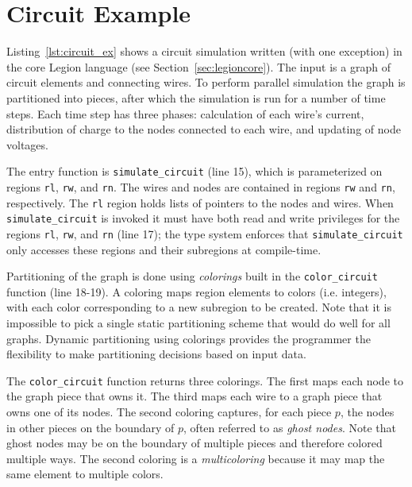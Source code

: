 
\section{Circuit Example}
\label{sec:example}

Listing~\ref{lst:circuit_ex} shows a circuit simulation written (with
one exception) in the core Legion language (see
Section~\ref{sec:legioncore}).  The input is a graph of circuit
elements and connecting wires.  To perform parallel
simulation the graph is partitioned into pieces, after which the
simulation is run for a number of time steps.  Each time step has
three phases: calculation of each wire's current, distribution of charge to
the nodes connected to each wire, and updating of node voltages.

The entry function is {\tt simulate\_circuit} (line 15), which is
parameterized on regions {\tt rl}, {\tt rw}, and {\tt rn}.
The wires and nodes are contained in regions {\tt rw} and {\tt rn},
respectively.  The {\tt rl} region holds lists of pointers to the nodes and wires.
When {\tt simulate\_circuit} is invoked it must have both read and
write privileges for the regions {\tt rl}, {\tt rw}, and {\tt rn}
(line 17); the type system enforces that
{\tt simulate\_circuit} only accesses these regions and their
subregions at compile-time.

Partitioning of the graph is done using {\em colorings} built in the
{\tt color\_circuit} function (line 18-19).  A coloring maps region
elements to colors (i.e. integers), with each color corresponding
 to a new subregion
to be created.  Note that it is impossible to pick a single static
partitioning scheme that would do well for all graphs.  Dynamic
partitioning using colorings provides the programmer the flexibility
to make partitioning decisions based on input data.

The {\tt color\_circuit} function returns three colorings.  The first
maps each node to the graph piece that owns it.
The third maps each wire to a graph piece that
owns one of its nodes.  The second coloring captures, for each piece $p$,
the nodes in other pieces on the boundary of $p$, often referred to as
{\em ghost nodes}.  
Note that 
ghost nodes may be on the boundary of multiple pieces and therefore colored
multiple ways.  The second coloring is a {\em multicoloring} because
it may map the same element to multiple colors.

